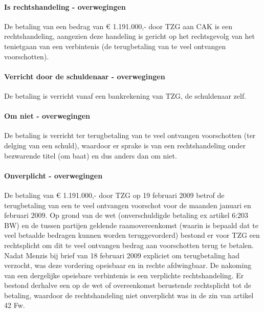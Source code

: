 \documentclass[
  dutch,
  a4paper,
]{article}
\begin{document}
\paragraph{Is rechtshandeling - overwegingen}\label{is-rechtshandeling---overwegingen-83}

De betaling van een bedrag van € 1.191.000,- door TZG aan CAK is een rechtshandeling, aangezien deze handeling is gericht op het rechtsgevolg van het tenietgaan van een verbintenis (de terugbetaling van te veel ontvangen voorschotten).

\paragraph{Verricht door de schuldenaar - overwegingen}\label{verricht-door-de-schuldenaar---overwegingen-83}

De betaling is verricht vanaf een bankrekening van TZG, de schuldenaar zelf.

\paragraph{Om niet - overwegingen}\label{om-niet---overwegingen-83}

De betaling is verricht ter terugbetaling van te veel ontvangen voorschotten (ter delging van een schuld), waardoor er sprake is van een rechtshandeling onder bezwarende titel (om baat) en dus anders dan om niet.

\paragraph{Onverplicht - overwegingen}\label{onverplicht---overwegingen-83}

De betaling van € 1.191.000,- door TZG op 19 februari 2009 betrof de terugbetaling van een te veel ontvangen voorschot voor de maanden januari en februari 2009. Op grond van de wet (onverschuldigde betaling ex artikel 6:203 BW) en de tussen partijen geldende raamovereenkomst (waarin is bepaald dat te veel betaalde bedragen kunnen worden teruggevorderd) bestond er voor TZG een rechtsplicht om dit te veel ontvangen bedrag aan voorschotten terug te betalen. Nadat Menzis bij brief van 18 februari 2009 expliciet om terugbetaling had verzocht, was deze vordering opeisbaar en in rechte afdwingbaar. De nakoming van een dergelijke opeisbare verbintenis is een verplichte rechtshandeling. Er bestond derhalve een op de wet of overeenkomst berustende rechtsplicht tot de betaling, waardoor de rechtshandeling niet onverplicht was in de zin van artikel 42 Fw.
\end{document}
